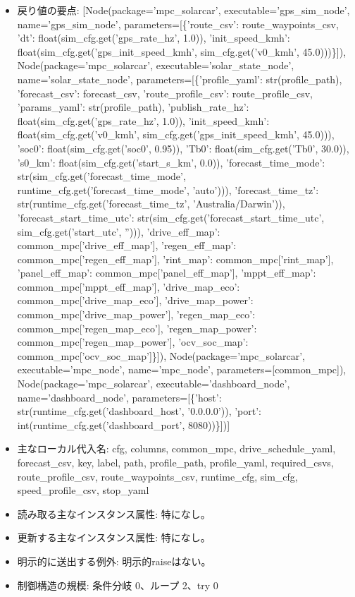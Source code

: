 \documentclass[a4paper,11pt]{article}
\begin{document}
\begin{itemize}[leftmargin=1.6em]
              \item 戻り値の要点: [Node(package='mpc\_solarcar', executable='gps\_sim\_node', name='gps\_sim\_node', parameters=[\{'route\_csv': route\_waypoints\_csv, 'dt': float(sim\_cfg.get('gps\_rate\_hz', 1.0)), 'init\_speed\_kmh': float(sim\_cfg.get('gps\_init\_speed\_kmh', sim\_cfg.get('v0\_kmh', 45.0)))\}]), Node(package='mpc\_solarcar', executable='solar\_state\_node', name='solar\_state\_node', parameters=[\{'profile\_yaml': str(profile\_path), 'forecast\_csv': forecast\_csv, 'route\_profile\_csv': route\_profile\_csv, 'params\_yaml': str(profile\_path), 'publish\_rate\_hz': float(sim\_cfg.get('gps\_rate\_hz', 1.0)), 'init\_speed\_kmh': float(sim\_cfg.get('v0\_kmh', sim\_cfg.get('gps\_init\_speed\_kmh', 45.0))), 'soc0': float(sim\_cfg.get('soc0', 0.95)), 'Tb0': float(sim\_cfg.get('Tb0', 30.0)), 's0\_km': float(sim\_cfg.get('start\_s\_km', 0.0)), 'forecast\_time\_mode': str(sim\_cfg.get('forecast\_time\_mode', runtime\_cfg.get('forecast\_time\_mode', 'auto'))), 'forecast\_time\_tz': str(runtime\_cfg.get('forecast\_time\_tz', 'Australia/Darwin')), 'forecast\_start\_time\_utc': str(sim\_cfg.get('forecast\_start\_time\_utc', sim\_cfg.get('start\_utc', ''))), 'drive\_eff\_map': common\_mpc['drive\_eff\_map'], 'regen\_eff\_map': common\_mpc['regen\_eff\_map'], 'rint\_map': common\_mpc['rint\_map'], 'panel\_eff\_map': common\_mpc['panel\_eff\_map'], 'mppt\_eff\_map': common\_mpc['mppt\_eff\_map'], 'drive\_map\_eco': common\_mpc['drive\_map\_eco'], 'drive\_map\_power': common\_mpc['drive\_map\_power'], 'regen\_map\_eco': common\_mpc['regen\_map\_eco'], 'regen\_map\_power': common\_mpc['regen\_map\_power'], 'ocv\_soc\_map': common\_mpc['ocv\_soc\_map']\}]), Node(package='mpc\_solarcar', executable='mpc\_node', name='mpc\_node', parameters=[common\_mpc]), Node(package='mpc\_solarcar', executable='dashboard\_node', name='dashboard\_node', parameters=[\{'host': str(runtime\_cfg.get('dashboard\_host', '0.0.0.0')), 'port': int(runtime\_cfg.get('dashboard\_port', 8080))\}])]
              \item 主なローカル代入名: cfg, columns, common\_mpc, drive\_schedule\_yaml, forecast\_csv, key, label, path, profile\_path, profile\_yaml, required\_csvs, route\_profile\_csv, route\_waypoints\_csv, runtime\_cfg, sim\_cfg, speed\_profile\_csv, stop\_yaml
              \item 読み取る主なインスタンス属性: 特になし。
              \item 更新する主なインスタンス属性: 特になし。
              \item 明示的に送出する例外: 明示的raiseはない。
              \item 制御構造の規模: 条件分岐 0、ループ 2、try 0
            \end{itemize}
\end{document}
